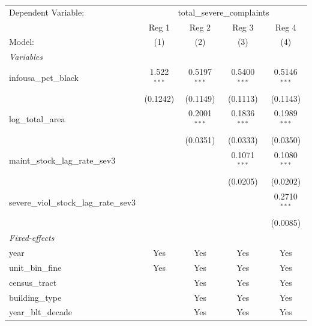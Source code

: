 \begingroup
\centering
\begin{tabular}{lcccc}
   \tabularnewline \midrule \midrule
   Dependent Variable: & \multicolumn{4}{c}{total\_severe\_complaints}\\
                                             & Reg 1         & Reg 2          & Reg 3          & Reg 4 \\   
   Model:                                    & (1)           & (2)            & (3)            & (4)\\  
   \midrule
   \emph{Variables}\\
   infousa\_pct\_black                       & 1.522$^{***}$ & 0.5197$^{***}$ & 0.5400$^{***}$ & 0.5146$^{***}$\\   
                                             & (0.1242)      & (0.1149)       & (0.1113)       & (0.1143)\\   
   log\_total\_area                          &               & 0.2001$^{***}$ & 0.1836$^{***}$ & 0.1989$^{***}$\\   
                                             &               & (0.0351)       & (0.0333)       & (0.0350)\\   
   maint\_stock\_lag\_rate\_sev3             &               &                & 0.1071$^{***}$ & 0.1080$^{***}$\\   
                                             &               &                & (0.0205)       & (0.0202)\\   
   severe\_viol\_stock\_lag\_rate\_sev3      &               &                &                & 0.2710$^{***}$\\   
                                             &               &                &                & (0.0085)\\   
   \midrule
   \emph{Fixed-effects}\\
   year                                      & Yes           & Yes            & Yes            & Yes\\  
   unit\_bin\_fine                           & Yes           & Yes            & Yes            & Yes\\  
   census\_tract                             &               & Yes            & Yes            & Yes\\  
   building\_type                            &               & Yes            & Yes            & Yes\\  
   year\_blt\_decade                         &               & Yes            & Yes            & Yes\\  

\end{tabular}
